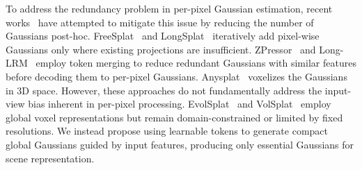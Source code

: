 To address the redundancy problem in per-pixel Gaussian estimation, recent works~\cite{wang2024freesplat, huang2025longsplat, wang2025zpressor, zhang2024gaussian, ziwen2025long,jiang2025anysplat} have attempted to mitigate this issue by reducing the number of Gaussians post-hoc. FreeSplat~\cite{wang2024freesplat} and LongSplat~\cite{huang2025longsplat} iteratively add pixel-wise Gaussians only where existing projections are insufficient. ZPressor~\cite{wang2025zpressor} and Long-LRM~\cite{ziwen2025long} employ token merging to reduce redundant Gaussians with similar features before decoding them to per-pixel Gaussians. Anysplat~\cite{jiang2025anysplat} voxelizes the Gaussians in 3D space. However, these approaches do not fundamentally address the input-view bias inherent in per-pixel processing. EvolSplat~\cite{miao2025evolsplat} and VolSplat~\cite{wang2025volsplat} employ global voxel representations but remain domain-constrained or limited by fixed resolutions. We instead propose using learnable tokens to generate compact global Gaussians guided by input features, producing only essential Gaussians for scene representation.

